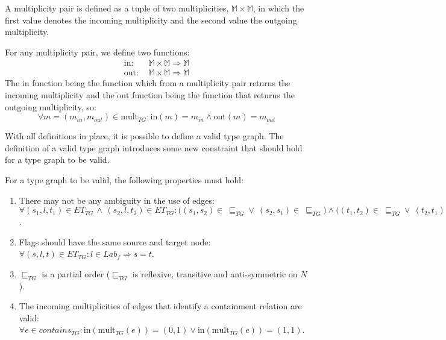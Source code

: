 \begin{defin}
\label{defin:formalisations:groove_formalisation:type_graphs:multiplicity_pair}
A multiplicity pair is defined as a tuple of two multiplicities, $\mathbb{M} \times \mathbb{M}$, in which the first value denotes the incoming multiplicity and the second value the outgoing multiplicity.

For any multiplicity pair, we define two functions:
\begin{align*}
    \mathrm{in}\!:&\: \mathbb{M} \times \mathbb{M} \Rightarrow \mathbb{M} \\
    \mathrm{out}\!:&\: \mathbb{M} \times \mathbb{M} \Rightarrow \mathbb{M}
\end{align*}
The $\mathrm{in}$ function being the function which from a multiplicity pair returns the incoming multiplicity and the $\mathrm{out}$ function being the function that returns the outgoing multiplicity, so:
\begin{equation*}
\forall m = (m_{in}, m_{out}) \in \mathrm{mult}_{TG}: \mathrm{in}(m) = m_{in} \land \mathrm{out}(m) = m_{out}  
\end{equation*}

\end{defin}

With all definitions in place, it is possible to define a valid type graph.
The definition of a valid type graph introduces some new constraint that should hold for a type graph to be valid.

\begin{defin}
\label{defin:formalisations:groove_formalisation:type_graphs:type_graph_validity}
For a type graph to be valid, the following properties must hold:
\begin{enumerate}
    \item There may not be any ambiguity in the use of edges: $\forall (s_1, l, t_1) \in ET_{TG}\,\land\, (s_2, l, t_2) \in ET_{TG}\!: \big((s_1, s_2) \in\ \sqsubseteq_{TG} \lor\ (s_2, s_1) \in\ \sqsubseteq_{TG}\!\!\big) \land \big((t_1, t_2) \in\ \sqsubseteq_{TG} \lor\ (t_2, t_1) \in\ \sqsubseteq_{TG}\!\!\big) \Longrightarrow s_1 = s_2 \land t_1 = t_2$.
    \item Flags should have the same source and target node: $\forall (s, l, t) \in ET_{TG}: l \in Lab_f \Longrightarrow s = t$.
    \item $\sqsubseteq_{TG}$ is a partial order ($\sqsubseteq_{TG}$ is reflexive, transitive and anti-symmetric on $N\!$).
    \item The incoming multiplicities of edges that identify a containment relation are valid: $\forall e \in contains_{TG}: \mathrm{in}(\mathrm{mult}_{TG}(e)) = (0, 1) \lor \mathrm{in}(\mathrm{mult}_{TG}(e)) = (1, 1)$.
\end{enumerate}

\end{defin}

